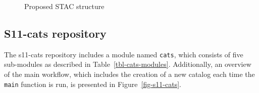 \documentclass[
  oneside,
  open=any]{scrbook}
\begin{document}
\begin{figure}[H]


\caption{\label{fig-stac-str}Proposed STAC structure}

\end{figure}%

\subsection{S11-cats repository}\label{s11-cats-repository}

The s11-cats repository includes a module named \texttt{cats}, which
consists of five sub-modules as described in
Table~\ref{tbl-cats-modules}. Additionally, an overview of the main
workflow, which includes the creation of a new catalog each time the
\texttt{main} function is run, is presented in
Figure~\ref{fig-s11-cats}.
\end{document}
